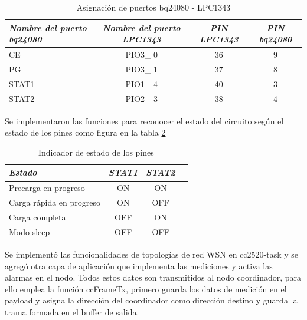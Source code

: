 {\begin{table}[ht]
	\centering
	\caption{Asignación de puertos bq24080 - LPC1343}
	\begin{tabular}{@{} l *3c @{}}    \toprule
		\emph{\textbf{Nombre del puerto bq24080}} & \emph{\textbf{Nombre del puerto LPC1343}} & \emph{\textbf{PIN LPC1343}} & \emph{\textbf{PIN bq24080}}\\
		\midrule
		CE &  PIO3\_ 0 & 36 & 9	\\	
		PG	&  PIO3\_ 1 & 37 & 8\\
		STAT1 &  PIO1\_ 4 & 40 & 3\\
		STAT2 &  PIO2\_ 3 & 38 & 4\\

		\bottomrule
		\hline
	\end{tabular}
	\label{tab:bq}
\end{table}

Se implementaron las funciones para reconocer el estado del circuito según el estado de los pines como figura en la tabla \ref{tab:bq}

\begin{table}[ht]
	\centering
	\caption{Indicador de estado de los pines}
	\begin{tabular}{@{} l *3c @{}}    \toprule
		\emph{\textbf{Estado}} & \emph{\textbf{STAT1}} & \emph{\textbf{STAT2}}\\
		\midrule
		Precarga en progreso &  ON & ON \\	
		Carga rápida en progreso	&  ON & OFF \\
		Carga completa &  OFF & ON \\
		Modo sleep &  OFF & OFF \\

		\bottomrule
		\hline
	\end{tabular}
	\label{tab:bq}
\end{table}


Se implementó las funcionalidades de topologías de red WSN en cc2520-task y se agregó otra capa de aplicación que implementa las mediciones y activa las alarmas en el nodo. Todos estos datos son transmitidos al nodo coordinador, para ello emplea la función ccFrameTx, primero guarda los datos de medición en el payload y asigna la dirección del coordinador como dirección destino y guarda la trama formada en el buffer de salida.

}
